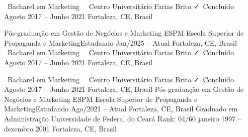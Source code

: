 \begin{commentA}
\cvevent
{\faUserGraduate\ Bacharel em Marketing\ \hfill \faMedal}
{{\ Centro Universitário Farias Brito}
  \hfill \faCheck\ Concluído}
{Agosto 2017 -- Junho 2021}
{Fortaleza, CE, Brasil}
\end{commentA}
\begin{commentB}
\cvevent
{\faUserGraduate Pós-graduação em Gestão de Negócios e Marketing}
{ESPM Escola Superior de Propaganda e Marketing\hfill Estudando}
{Jan/2025 -- Atual}
{Fortaleza, CE, Brasil}
\divider
\cvevent
{\faUserGraduate\ Bacharel em Marketing\ \hfill \faMedal}
{{\ Centro Universitário Farias Brito}
  \hfill \faCheck\ Concluído}
{Agosto 2017 -- Junho 2021}
{Fortaleza, CE, Brasil}
\end{commentB}
\begin{commentC}
\cvevent
{\faUserGraduate\ Bacharel em Marketing\ \hfill \faMedal}
{{\ Centro Universitário Farias Brito}
  \hfill \faCheck\ Concluído}
{Agosto 2017 -- Junho 2021}
{Fortaleza, CE, Brasil}
\divider
\cvevent
{\faUserGraduate Pós-graduação em Gestão de Negócios e Marketing}
{ESPM Escola Superior de Propaganda e Marketing\hfill Estudando}
{Ago/2021 -- Atual}
{Fortaleza, CE, Brasil}
\divider
\cvevent
{\faUserGraduate Graduado em Administração}
{Universidade de Federal do Ceará \hfill \faCalculator Rank: 04/60}
{janeiro 1997 -- dezembro 2001}
{Fortaleza, CE, Brasil}
\end{commentC}
\begin{commentD}
%
\end{commentD}
\begin{commentE}
%
\end{commentE}
\begin{commentF}
%
\end{commentF}
\begin{commentG}
%
\end{commentG}
\begin{commentH}
%
\end{commentH}
\begin{commentI}
%
\end{commentI}
